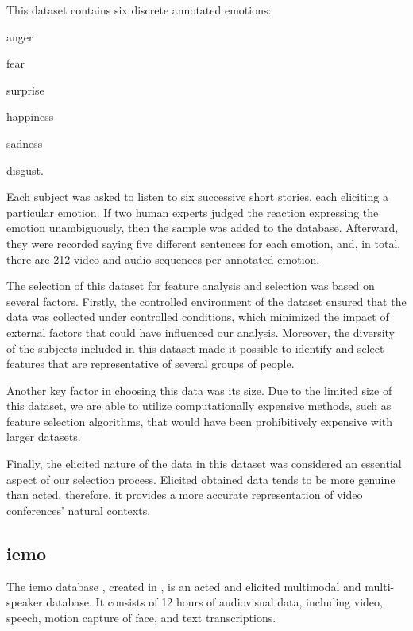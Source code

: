 This dataset contains six discrete annotated emotions: \begin{enumerate*}\item anger \item fear \item surprise \item happiness \item sadness \item disgust. \end{enumerate*} Each subject was asked to listen to six successive short stories, each eliciting a particular emotion. If two human experts judged the reaction expressing the emotion unambiguously, then the sample was added to the database. Afterward, they were recorded saying five different sentences for each emotion, and, in total, there are 212 video and audio sequences per annotated emotion.

The selection of this dataset for feature analysis and selection was based on several factors. Firstly, the controlled environment of the dataset ensured that the data was collected under controlled conditions, which minimized the impact of external factors that could have influenced our analysis. Moreover, the diversity of the subjects included in this dataset made it possible to identify and select features that are representative of several groups of people.

Another key factor in choosing this data was its size. Due to the limited size of this dataset, we are able to utilize computationally expensive methods, such as feature selection algorithms, that would have been prohibitively expensive with larger datasets.

Finally, the elicited nature of the data in this dataset was considered an essential aspect of our selection process. Elicited obtained data tends to be more genuine than acted, therefore, it provides a more accurate representation of video conferences' natural contexts.

\subsection{\ac{iemo}}

The \ac{iemo} database \cite{Busso2008}, created in \citeyear{Busso2008}, is an acted and elicited multimodal and multi-speaker database. It consists of 12 hours of audiovisual data, including video, speech, motion capture of face, and text transcriptions.

